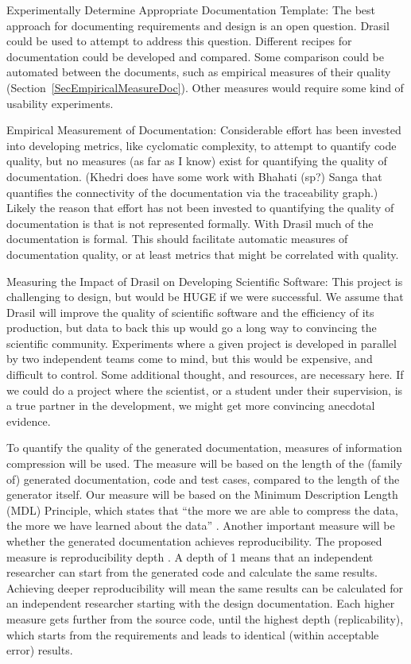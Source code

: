 \documentclass[12pt]{article}
\begin{document}
Experimentally Determine Appropriate Documentation Template: The best approach
for documenting requirements and design is an open question.  Drasil could be
used to attempt to address this question.  Different recipes for documentation
could be developed and compared.  Some comparison could be automated between the
documents, such as empirical measures of their quality
(Section~\ref{SecEmpiricalMeasureDoc}).  Other measures would require some kind
of usability experiments.

Empirical Measurement of Documentation: Considerable effort has been invested
into developing metrics, like cyclomatic complexity, to attempt to quantify code
quality, but no measures (as far as I know) exist for quantifying the quality of
documentation.  (Khedri does have some work with Bhahati (sp?) Sanga that
quantifies the connectivity of the documentation via the traceability graph.)
Likely the reason that effort has not been invested to quantifying the quality
of documentation is that is not represented formally.  With Drasil much of the
documentation is formal.  This should facilitate automatic measures of
documentation quality, or at least metrics that might be correlated with
quality.

Measuring the Impact of Drasil on Developing Scientific Software: This project
is challenging to design, but would be HUGE if we were successful.  We assume
that Drasil will improve the quality of scientific software and the efficiency
of its production, but data to back this up would go a long way to convincing
the scientific community.  Experiments where a given project is developed in
parallel by two independent teams come to mind, but this would be expensive, and
difficult to control.  Some additional thought, and resources, are necessary
here.  If we could do a project where the scientist, or a student under their
supervision, is a true partner in the development, we might get more convincing
anecdotal evidence.

To quantify the quality of the generated documentation, measures of information
compression will be used.  The measure will be based on the length of the
(family of) generated documentation, code and test cases, compared to the length
of the generator itself.  Our measure will be based on the Minimum Description
Length (MDL) Principle, which states that ``the more we are able to compress the
data, the more we have learned about the data'' \citep{Grunwald2004}.  Another
important measure will be whether the generated documentation achieves
reproducibility. The proposed measure is reproducibility depth
\citep{Soergel2014}.  A depth of 1 means that an independent researcher can
start from the generated code and calculate the same results.  Achieving deeper
reproducibility will mean the same results can be calculated for an independent
researcher starting with the design documentation.  Each higher measure gets
further from the source code, until the highest depth (replicability), which
starts from the requirements and leads to identical (within acceptable error)
results.
\end{document}
